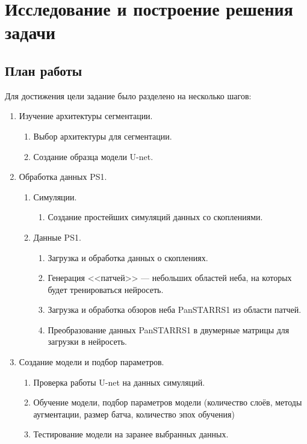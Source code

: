 \chapter{Исследование и построение решения задачи}
\label{cha:ch_3}

\section{План работы}
Для достижения цели задание было разделено на несколько шагов:

\begin{enumerate}

    \item Изучение архитектуры сегментации.
    \begin{enumerate}
        \item Выбор архитектуры для сегментации.
        \item Создание образца модели U-net.
    \end{enumerate}

    \item Обработка данных PS1.
    \begin{enumerate}
        \item Симуляции.
        \begin{enumerate}
            \item Создание простейших симуляций данных со скоплениями.
        \end{enumerate}
        \item Данные PS1.
        \begin{enumerate}
            \item Загрузка и обработка данных о скоплениях.
            \item Генерация <<патчей>> --- небольших областей неба, на которых будет тренироваться нейросеть.
            \item Загрузка и обработка обзоров неба PanSTARRS1 из области патчей.
            \item Преобразование данных PanSTARRS1 в двумерные матрицы для загрузки в нейросеть.
        \end{enumerate}
    \end{enumerate}

    \item Создание модели и подбор параметров.
    \begin{enumerate}
        \item Проверка работы U-net на данных симуляций.
        \item Обучение модели, подбор параметров модели (количество слоёв, методы аугментации, размер 
            батча, количество эпох обучения)
        \item Тестирование модели на заранее выбранных данных.
    \end{enumerate}


\end{enumerate}
